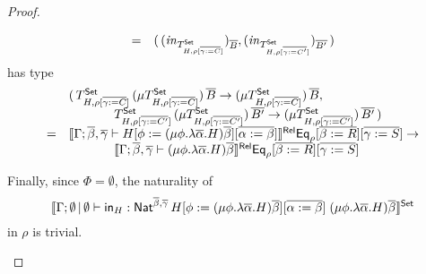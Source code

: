 \documentclass[acmsmall,review,anonymous]{acmart}
\theoremstyle{definition}
\begin{document}
\begin{proof}
\begin{itemize}
\[\begin{array}{ll}
=& (\, (\mathit{in}_{T^{\mathsf{Set}}_{H,\rho[\overline{\gamma := C}]}})_{\overline{B}},
(\mathit{in}_{T^{\mathsf{Set}}_{H,\rho[\overline{\gamma := C'}]}})_{\overline{B'}}\,)
\end{array}\]
has type
\[\begin{array}{ll}
& (\, T^{\mathsf{Set}}_{H,\rho[\overline{\gamma := C}]}\, (\mu
T^{\mathsf{Set}}_{H,\rho[\overline{\gamma := C}]}) \, 
\overline{B} \to (\mu T^{\mathsf{Set}}_{H,\rho[\overline{\gamma := C}]}) \, \overline{B}, \, \\
& \hspace*{0.5in}T^{\mathsf{Set}}_{H,\rho[\overline{\gamma := C'}]}\, (\mu
T^{\mathsf{Set}}_{H,\rho[\overline{\gamma := C'}]}) \, 
\overline{B'} \to (\mu T^{\mathsf{Set}}_{H,\rho[\overline{\gamma := C'}]}) \,\overline{B'} \, )\\
= &
 \llbracket{\Gamma;\overline{\beta},\overline{\gamma} \vdash H[\phi := (\mu
    \phi.\lambda {\overline \alpha}.H){\overline \beta}][\overline{\alpha :=
      \beta}]}\rrbracket^{\mathsf{Rel}}\mathsf{Eq}_\rho[\overline{\beta := R}][\overline{\gamma := S}] \to\\
 & \hspace*{0.5in} \llbracket{\Gamma;\overline{\beta},\overline{\gamma} \vdash (\mu
  \phi.\lambda \overline{\alpha}.H)\overline{\beta}}\rrbracket^{\mathsf{Rel}} \mathsf{Eq}_\rho[\overline{\beta:=
    R}][\overline{\gamma :=S}]
\end{array}\]

Finally, since $\Phi = \emptyset$, the naturality of
\[
\llbracket{\Gamma;\emptyset \,|\, \emptyset \vdash \mathsf{in}_H :
  \mathsf{Nat}^{\overline{\beta},\overline{\gamma}} \, H[\phi := (\mu \phi.\lambda
    {\overline \alpha}.H){\overline \beta}][\overline{\alpha := \beta}]
  \;(\mu \phi.\lambda {\overline \alpha}.H){\overline \beta}}\rrbracket^{\mathsf{Set}}
\]
in $\rho$ is trivial.




\end{itemize}
\end{proof}
\end{document}
